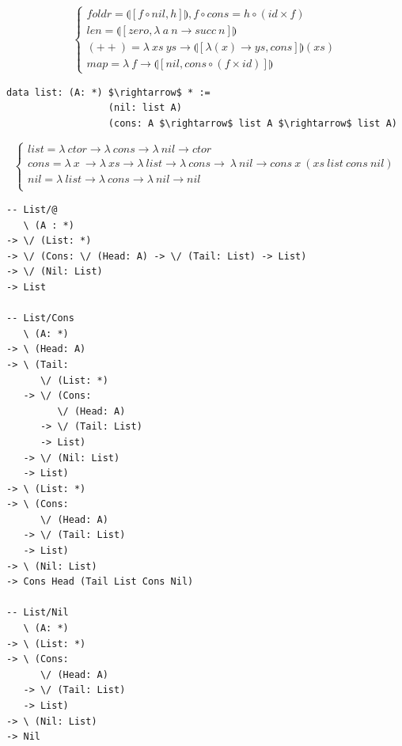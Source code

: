 \documentclass[11pt,oneside]{article}
\begin{document}
\vspace{0.5cm}
$$
\begin{cases}
foldr = \llparenthesis [ f \circ nil , h] \rrparenthesis, f \circ cons = h \circ (id \times f)\\
len = \llparenthesis [ zero, \lambda\ a\ n \rightarrow succ\ n ] \rrparenthesis \\
(++) = \lambda\ xs\ ys \rightarrow \llparenthesis [ \lambda (x) \rightarrow ys, cons ] \rrparenthesis (xs) \\
map = \lambda\ f \rightarrow \llparenthesis [ nil, cons \circ (f \times id)] \rrparenthesis
\end{cases}
$$

\begin{lstlisting}[mathescape=true]
             data list: (A: *) $\rightarrow$ * :=
                  (nil: list A)
                  (cons: A $\rightarrow$ list A $\rightarrow$ list A)
\end{lstlisting}

$$
\begin{cases}
list = \lambda\ ctor \rightarrow \lambda\ cons \rightarrow \lambda\ nil \rightarrow ctor\\
cons = \lambda\ x\ \rightarrow \lambda\ xs \rightarrow \lambda\ list \rightarrow \lambda\ cons \rightarrow\ \lambda\ nil \rightarrow cons\ x\ (xs\ list\ cons\ nil)\\
nil = \lambda\ list \rightarrow \lambda\ cons \rightarrow \lambda\ nil \rightarrow nil\\
\end{cases}
$$

\begin{lstlisting}[mathescape=true]
-- List/@
   \ (A : *)
-> \/ (List: *)
-> \/ (Cons: \/ (Head: A) -> \/ (Tail: List) -> List)
-> \/ (Nil: List)
-> List

-- List/Cons
   \ (A: *)
-> \ (Head: A)
-> \ (Tail:
      \/ (List: *)
   -> \/ (Cons:
         \/ (Head: A)
      -> \/ (Tail: List)
      -> List)
   -> \/ (Nil: List)
   -> List)
-> \ (List: *)
-> \ (Cons:
      \/ (Head: A)
   -> \/ (Tail: List)
   -> List)
-> \ (Nil: List)
-> Cons Head (Tail List Cons Nil)

-- List/Nil
   \ (A: *)
-> \ (List: *)
-> \ (Cons:
      \/ (Head: A)
   -> \/ (Tail: List)
   -> List)
-> \ (Nil: List)
-> Nil
\end{lstlisting}
\end{document}
